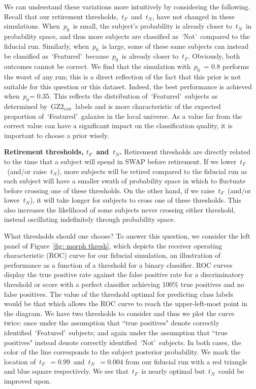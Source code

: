 \documentclass[twocolumn]{aastex6}
\newcommand{\p}{$p_0$}
\newcommand{\tf}{$t_F$}
\newcommand{\tn}{$t_N$}
\newcommand{\feat}{`Featured'}
\newcommand{\notfeat}{`Not'}
\newcommand{\raw}{GZ2$_{\text{raw}}$}
\begin{document}
We can understand these variations more intuitively by considering the following.
Recall that our retirement thresholds,~\tf~and~\tn, have not changed in these simulations. 
When~\p~is small, the subject's probability is already closer to~\tn~in probability space, 
and thus more subjects are classified as~\notfeat~compared to the fiducial run.
Similarly, when~\p~is large, some of these same subjects can instead be classified
as~\feat~because~\p~is already closer to~\tf. Obviously, both outcomes cannot be correct. 
We find that the simulation with~\p~= 0.8 performs the worst of any run; 
this is a direct reflection of the fact that this prior is not suitable for this question or this dataset. 
 Indeed, the best performance is achieved when~\p = 0.35.  This reflects the 
distribution of~\feat~subjects as determined by~\raw~labels and is more characteristic
of the expected proportion of~\feat~galaxies in the local universe.
As a value far from the correct value can have a significant impact on the classification
quality, it is important to choose a prior wisely.
 


\textbf{Retirement thresholds, \tf~and~\tn.}
Retirement thresholds are directly related to the time that a subject will spend
in SWAP before retirement.  If we lower~\tf~(and/or raise~\tn), more subjects will be retired
compared to the fiducial run as each subject will have a smaller swath of probability space
in which to fluctuate before crossing one of these thresholds.
On the other hand, if we raise~\tf~(and/or lower~\tn), it will take longer for subjects
to cross one of these thresholds. This also increases the likelihood of some subjects 
never crossing either threshold, instead oscillating indefinitely through probability space.

What thresholds should one choose? To answer this question, we consider the left panel of
Figure~\ref{fig: morph thresh}, which depicts the receiver operating 
characteristic (ROC) curve for our fiducial simulation, an illustration of performance as a 
function of a threshold for a binary classifier. 
ROC curves display the true positive rate against the false positive rate for 
a discriminatory threshold or score with a perfect classifier achieving 100\% true positives
and no false positives. The value of the threshold optimal for predicting class labels would 
be that which allows the ROC curve to reach the upper-left-most point in the diagram. 
We have two thresholds to consider and thus we plot the curve twice: 
once under the assumption that ``true positives" denote correctly identified~\feat~subjects; 
and again under the assumption that ``true positives" instead denote correctly identified~\notfeat~subjects.  In both cases, the color of the line corresponds to the 
subject posterior probability. We mark the location of~\tf~$=0.99$~and~\tn~$=0.004$
from our fiducial run with a red triangle and blue square respectively. 
 We see that~\tf~is nearly optimal but~\tn~could be improved upon. 
\end{document}
